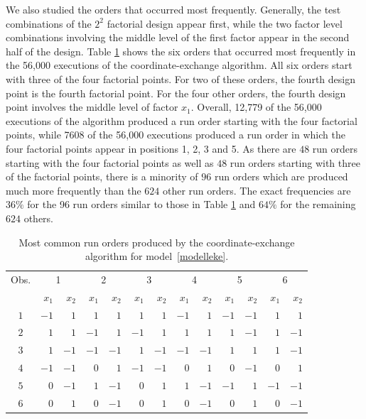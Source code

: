 
We also studied the orders that occurred most frequently. Generally, the test combinations of the $2^2$ factorial design appear first, while the two factor level combinations involving the middle level of the first factor appear in the second half of the design. Table \ref{bestworst} shows the six orders that occurred most frequently in the 56,000 executions of the coordinate-exchange algorithm. All six orders start with three of the four factorial points. For two of these orders, the fourth design point is the fourth factorial point. For the four other orders, the fourth design point involves the middle level of factor $x_1$. Overall, 12,779 of the 56,000 executions of the algorithm produced a run order starting with the four factorial points, while 7608 of the 56,000 executions produced a run order in which the four factorial points appear in positions 1, 2, 3 and 5. As there are $48$ run orders starting with the four factorial points as well as $48$ run orders starting with three of the factorial points, there is a minority of $96$ run orders {\color{red}which are} produced much more frequently than the $624$ other run orders.
The exact frequencies are $36\%$ for the 96 run orders similar to those in Table \ref{bestworst} and $64\%$ for the remaining $624$ others.\\

\begin{table}
	\caption{Most common run orders produced by the coordinate-exchange algorithm for model~\eqref{modelleke}.}
	\begin{center}
		\label{bestworst}
		\begin{tabular}{|c|rr|rr|rr|rr|rr|rr|}
			\hline 
			Obs. & \multicolumn{2}{|c|}{1} & \multicolumn{2}{|c|}{2} & \multicolumn{2}{|c|}{3}&
			\multicolumn{2}{|c|}{4} & \multicolumn{2}{|c|}{5}&
			\multicolumn{2}{|c|}{6}
			\\
			& $x_1$ & $x_2$ & $x_1$ & $x_2$& $x_1$ & $x_2$ & $x_1$ & $x_2$ & $x_1$ & $x_2$& $x_1$ & $x_2$\\
			\hline
			$1	$&$	-1	$&$	1	$&$	1	$&$	1	$&$	1	$&$	1
			    $&$	-1	$&$	1	$&$	-1	$&$	-1	$&$	1	$&$	1 $\\
			$2	$&$	1	$&$	1	$&$	-1	$&$	1	$&$	-1	$&$	1	 	
			    $&$	1	$&$	1	$&$	1	$&$	-1	$&$	1	$&$	-1 $\\
			$3	$&$	1	$&$	-1	$&$	-1	$&$	-1	$&$	1	$&$	-1
			    $&$	-1	$&$	-1	$&$	1	$&$	1	$&$	1	$&$	-1 $\\	 
			$4	$&$	-1	$&$	-1	$&$	0	$&$	1	$&$	-1	$&$	-1	 
			    $&$	0	$&$	1	$&$	0	$&$	-1	$&$	0	$&$	1 $\\
			$5	$&$	0	$&$	-1	$&$	1	$&$	-1	$&$	0	$&$	1
			    $&$	1	$&$	-1	$&$	-1	$&$	1	$&$	-1	$&$	-1 $\\
			$6	$&$	0	$&$	1	$&$	0	$&$	-1	$&$	0	$&$	1
			    $&$	0	$&$	-1	$&$	0	$&$	1	$&$	0	$&$	-1 $\\
			\hline
		\end{tabular}
	\end{center}
\end{table}

